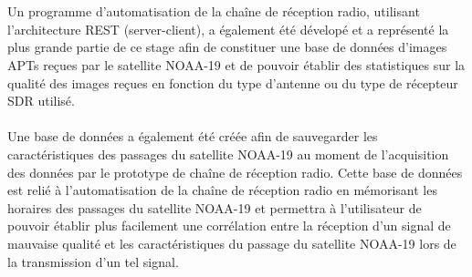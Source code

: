 \documentclass[12pt,fleqn]{book} %
\begin{document}
~\\\\Un programme d'automatisation de la chaîne de réception radio, utilisant l'architecture REST (server-client), a également été dévelopé et a représenté la plus grande partie de ce stage afin de constituer une base de données d'images APTs reçues par le satellite NOAA-19 et de pouvoir établir des statistiques sur la qualité des images reçues en fonction du type d'antenne ou du type de récepteur SDR utilisé. 
~\\\\Une base de données a également été créée afin de sauvegarder les caractéristiques des passages du satellite NOAA-19 au moment de l'acquisition des données par le prototype de chaîne de réception radio. Cette base de données est relié à l'automatisation de la chaîne de réception radio en mémorisant les horaires des passages du satellite NOAA-19 et permettra à l'utilisateur de pouvoir établir plus facilement une corrélation entre la réception d'un signal de mauvaise qualité et les caractéristiques du passage du satellite NOAA-19 lors de la transmission d'un tel signal. 
~\\\\\\
\end{document}
